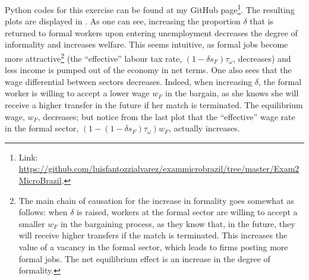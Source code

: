 \documentclass[12pt]{article}
\begin{document}
Python codes for this exercise can be found at my GitHub page\footnote{Link: \url{https://github.com/luisfantozzialvarez/exammicrobrazil/tree/master/Exam2MicroBrazil}.}. The resulting plots are displayed in . As one can see, increasing the proportion $\delta$ that is returned to formal workers upon entering unemployment decreases the degree of informality and increases welfare. This seems intuitive, as formal jobs become more attractive\footnote{The main chain of causation for the increase in formality goes somewhat as follows: when $\delta$ is raised, workers at the formal sector are willing to accept a smaller $w_F$ in the bargaining process, as they know that, in the future, they will receive higher transfers if the match is terminated. This increases the value of a vacancy in the formal sector, which leads to firms posting more formal jobs. The net equilibrium effect is an increase in the degree of formality. } (the ``effective'' labour tax rate, $(1 - \delta s_F)\tau_\omega$, decreases) and less income is pumped out of the economy in net terms. One also sees that the wage differential between sectors decreases. Indeed, when increasing $\delta$, the formal worker is willing to accept a lower wage $w_F$ in the bargain, as she knows she will receive a higher transfer in the future if her match is terminated. The equilibrium wage, $w_F$, decreases; but notice from the last plot that the ``effective'' wage rate in the formal sector, $(1 - (1 - \delta s_F)\tau_\omega)w_F$, actually increases. 
\end{document}
